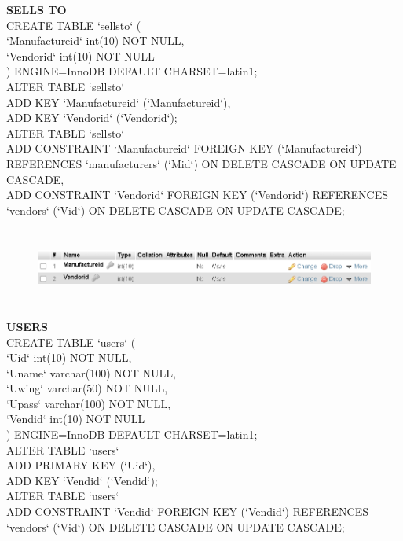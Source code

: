 \documentclass[12pt,a4paper]{report}
\begin{document}
\begin{flushleft}
\newpage
\textbf{SELLS TO}\\
CREATE TABLE `sellsto` (\\
  `Manufactureid` int(10) NOT NULL,\\
  `Vendorid` int(10) NOT NULL\\
) ENGINE=InnoDB DEFAULT CHARSET=latin1;\\
ALTER TABLE `sellsto`\\
  ADD KEY `Manufactureid` (`Manufactureid`),\\
  ADD KEY `Vendorid` (`Vendorid`);\\
  ALTER TABLE `sellsto`\\
  ADD CONSTRAINT `Manufactureid` FOREIGN KEY (`Manufactureid`) REFERENCES `manufacturers` (`Mid`) ON DELETE CASCADE ON UPDATE CASCADE,\\
  ADD CONSTRAINT `Vendorid` FOREIGN KEY (`Vendorid`) REFERENCES `vendors` (`Vid`) ON DELETE CASCADE ON UPDATE CASCADE;
\end{flushleft}
\begin{figure}[hbtp]
\centering
\includegraphics[width=6.0in,height=1.0in]{../fig/Sellsto}\\
\end{figure}
\begin{flushleft}
\newpage
\textbf{USERS}\\
CREATE TABLE `users` (\\
  `Uid` int(10) NOT NULL,\\
  `Uname` varchar(100) NOT NULL,\\
  `Uwing` varchar(50) NOT NULL,\\
  `Upass` varchar(100) NOT NULL,\\
  `Vendid` int(10) NOT NULL\\
) ENGINE=InnoDB DEFAULT CHARSET=latin1;\\
ALTER TABLE `users`\\
  ADD PRIMARY KEY (`Uid`),\\
  ADD KEY `Vendid` (`Vendid`);\\
 ALTER TABLE `users`\\
  ADD CONSTRAINT `Vendid` FOREIGN KEY (`Vendid`) REFERENCES `vendors` (`Vid`) ON DELETE CASCADE ON UPDATE CASCADE;
\end{flushleft}
\end{document}
